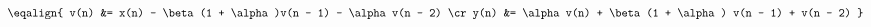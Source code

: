 \hsize 0pt
\vsize 0pt
\nopagenumbers
\overfullrule 0pt
\noindent
$$
\eqalign{
v(n) &= x(n) - \beta(1 + \alpha)v(n - 1) - \alpha v(n - 2)
\cr
y(n) &= \alpha v(n) + \beta(1 + \alpha) v(n - 1) + v(n - 2)
}
$$
\bye